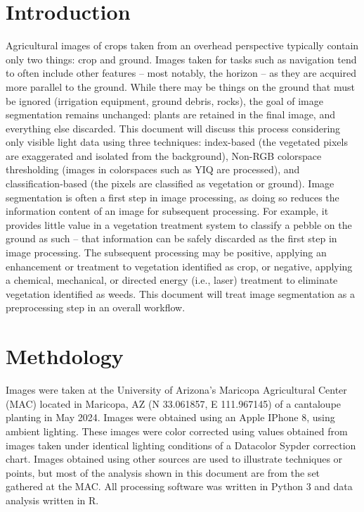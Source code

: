 \documentclass[letterpaper]{article}
\begin{document}
%
%



\section{Introduction}
Agricultural images of crops taken from an overhead perspective typically contain only two things: crop and ground.  Images taken for tasks such as navigation tend to often include other features -- most notably, the horizon -- as they are acquired more parallel to the ground. While there may be things on the ground that must be ignored (irrigation equipment, ground debris, rocks), the goal of image segmentation remains unchanged: plants are retained in the final image, and everything else discarded. This document will discuss this process considering only visible light data using three techniques: index-based (the vegetated pixels are exaggerated and isolated from the background), Non-RGB colorspace thresholding (images in colorspaces such as YIQ are processed), and  classification-based (the pixels are classified as vegetation or ground).  Image segmentation is often a first step in image processing, as doing so reduces the information content of an image for subsequent processing.  For example, it provides little value in a vegetation treatment system to classify a pebble on the ground as such -- that information can be safely discarded as the first step in image processing. The subsequent processing may be positive, applying an enhancement or treatment to vegetation identified as crop, or negative, applying a chemical, mechanical, or directed energy (i.e., laser) treatment to eliminate vegetation identified as weeds. This document will treat image segmentation as a preprocessing step in an overall workflow.

\section{Methdology}
Images were taken at the University of Arizona's Maricopa Agricultural Center (MAC) located in Maricopa, AZ (N 33.061857, E 111.967145) of a cantaloupe planting in May 2024. Images were obtained using an Apple IPhone 8, using ambient lighting. These images were color corrected using values obtained from images taken under identical lighting conditions of a Datacolor Sypder correction chart.  Images obtained using other sources are used to illustrate techniques or points, but most of the analysis shown in this document are from the set gathered at the MAC. All processing software was written in Python 3 and data analysis written in R.  
\end{document}
